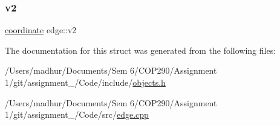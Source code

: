 \mbox{\label{structedge_a0d40d224ece0488b6a506ab842f0fa41}} 
\subsubsection{\texorpdfstring{v2}{v2}}
{\footnotesize\ttfamily \mbox{\hyperlink{structcoordinate}{coordinate}} edge\+::v2}



The documentation for this struct was generated from the following files\+:\begin{DoxyCompactItemize}
\item 
/\+Users/madhur/\+Documents/\+Sem 6/\+C\+O\+P290/\+Assignment 1/git/assignment\+\_/\+Code/include/\mbox{\hyperlink{objects_8h}{objects.\+h}}\item 
/\+Users/madhur/\+Documents/\+Sem 6/\+C\+O\+P290/\+Assignment 1/git/assignment\+\_/\+Code/src/\mbox{\hyperlink{edge_8cpp}{edge.\+cpp}}\end{DoxyCompactItemize}
